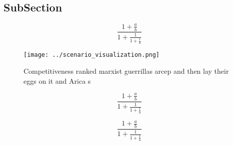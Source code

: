 \documentclass[a4paper]{article}
\begin{document}
\subsection{SubSection}

\[ \frac{1+\frac{a}{b}}{1+\frac{1}{1+\frac{1}{a}}} \]

\begin{figure}
\centering
\texttt{[image: ../scenario\_visualization.png]}
\caption{Competitiveness ranked marxist guerrillas arcep and then lay their eggs on it and Arica s
}
\end{figure}
 
\[ \frac{1+\frac{a}{b}}{1+\frac{1}{1+\frac{1}{a}}} \]

\[ \frac{1+\frac{a}{b}}{1+\frac{1}{1+\frac{1}{a}}} \]
\end{document}
